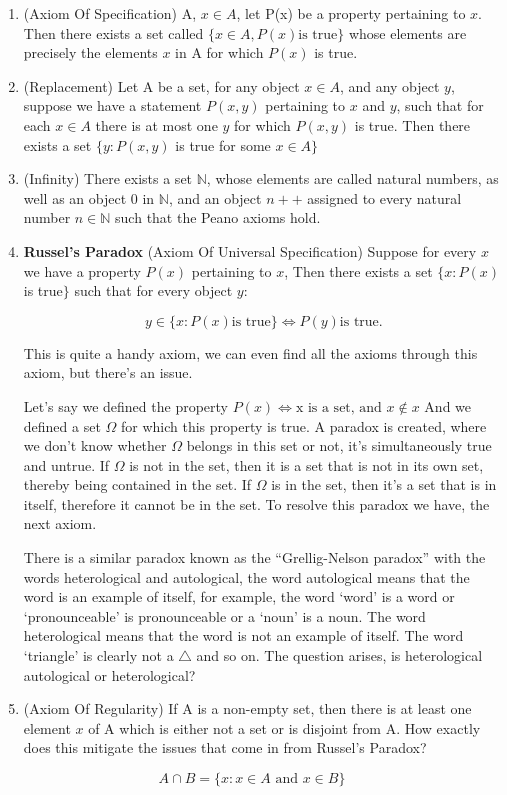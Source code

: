 \documentclass[11pt]{report}
\begin{document}
\begin{enumerate}
\begin{proof}
		      The two statements are equivalent.
	      \end{proof}
	\item (Axiom Of Specification) A, $x \in A$, let P(x) be a property pertaining to $x$. Then there exists a set called $\{x \in A, P(x) \text{is true}\}$ whose elements are precisely the elements $x$ in A for which $P(x)$ is true.
	\item (Replacement) Let A be a set, for any object $x \in A$, and any object $y$, suppose we have a statement $P(x,y)$ pertaining to $x$ and $y$, such that for each $x \in A$ there is at most one $y$ for which $P(x,y)$ is true. Then there exists a set $\{y : P(x,y)$ is true for some $x \in A\}$
	\item (Infinity) There exists a set $\mathbb{N}$, whose elements are called natural numbers, as well as an object $0$ in $\mathbb{N}$, and an object $n++$ assigned to every natural number $n \in \mathbb{N}$ such that the Peano axioms hold.

	\item \textbf{Russel's Paradox} (Axiom Of Universal Specification) Suppose for every $x$ we have a property $P(x)$ pertaining to $x$, Then there exists a set $\{x : P(x)$ is true$\}$ such that for every object $y$:

	      $$ y \in \{ x : P(x) \text{is true} \} \Leftrightarrow P(y) \text{is true.}$$

	      This is quite a handy axiom, we can even find all the axioms through this axiom, but there's an issue.

	      Let's say we defined the property $P(x) \Leftrightarrow \text{x is a set, and } x \notin x$
	      And we defined a set $\Omega$ for which this property is true.
	      A paradox is created, where we don't know whether $\Omega$ belongs in this set or not, it's simultaneously true and untrue. If $\Omega$ is not in the set, then it is a set that is not in its own set, thereby being contained in the set. If $\Omega$ is in the set, then it's a set that is in itself, therefore it cannot be in the set.
	      To resolve this paradox we have, the next axiom.
	      \begin{note}
		      There is a similar paradox known as the ``Grellig-Nelson paradox'' with the words heterological and autological, the word autological means that the word is an example of itself, for example, the word `word' is a word or `pronounceable' is pronounceable or a `noun' is a noun. The word heterological means that the word is not an example of itself. The word `triangle' is clearly not a $\triangle$ and so on. The question arises, is heterological autological or heterological?
	      \end{note}
	\item (Axiom Of Regularity) If A is a non-empty set, then there is at least one element $x$ of A which is either not a set or is disjoint from A.
	      How exactly does this mitigate the issues that come in from Russel's Paradox?
\end{enumerate}
\begin{definition}
	$$A \cap B = \{x: x \in A \text{ and } x \in B \}$$
\end{definition}
\end{document}
